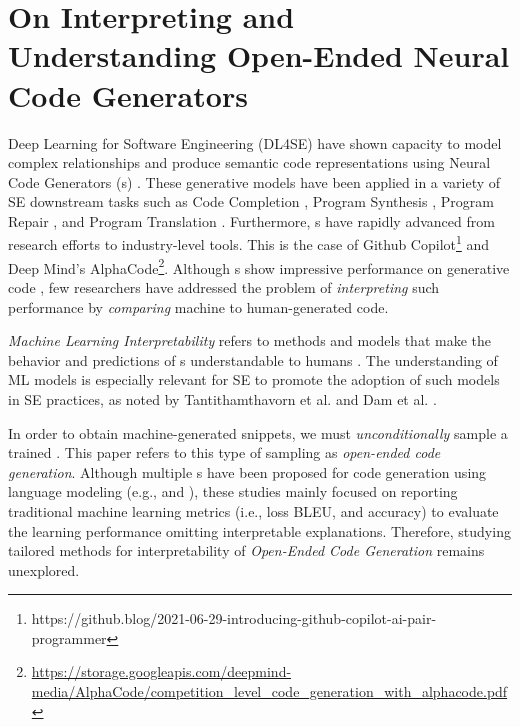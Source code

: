 \chapter{On Interpreting and Understanding \break Open-Ended Neural Code Generators}
\label{ch7:unconditioned}
Deep Learning for Software Engineering (DL4SE) have shown capacity to model complex relationships and produce semantic code representations using Neural Code Generators (\ncg s) \citep{Watson2020}. These generative models have been applied in a variety of SE downstream tasks such as Code Completion \cite{Nguyen2013}, Program Synthesis \cite{Gulwani2017},  Program Repair \citep{Chen2019}, and Program Translation \cite{Aggarwal2015}. Furthermore, \ncg s have rapidly advanced from research efforts to industry-level tools. This is the case of Github Copilot\footnote{https://github.blog/2021-06-29-introducing-github-copilot-ai-pair-programmer} and Deep Mind's AlphaCode\footnote{\url{ https://storage.googleapis.com/deepmind-media/AlphaCode/competition_level_code_generation_with_alphacode.pdf}}. Although \ncg s show impressive performance on generative code  \citep{Watson2020}, few researchers have addressed the problem of \textit{interpreting} such performance by \textit{comparing} machine to human-generated code. 

\textit{Machine Learning Interpretability} refers to methods and models that make the behavior and predictions of \ncg s understandable to humans \citep{Molnar2019}. The understanding of ML models is especially relevant for SE to promote the adoption of such models in SE practices, as noted by Tantithamthavorn et al. \citep{Tantithamthavorn2019} and Dam et al. \citep{Dam2018}.

In order to obtain machine-generated snippets, we must \textit{unconditionally} sample a trained \ncg. This paper refers to this type of sampling  as \textit{open-ended code generation}. Although multiple \ncg s have been proposed for code generation using language modeling (e.g., \citep{Cruz-Benito} and \citep{Chen2021}), these studies mainly focused on reporting traditional machine learning metrics (i.e., loss BLEU, and accuracy) to evaluate the learning performance omitting interpretable explanations. Therefore, studying tailored methods for interpretability of \textit{Open-Ended Code Generation} remains unexplored.

